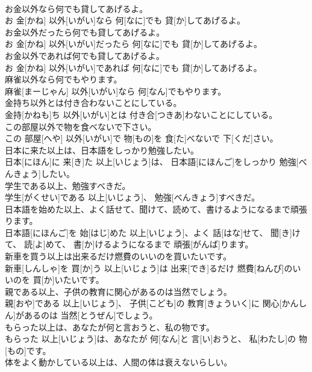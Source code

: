 \documentclass[8pt]{extreport}
\begin{document}
\begin{CJK}{UTF8}{min}
\\	お金以外なら何でも貸してあげるよ。	
\\	お 金[かね] 以外[いがい]なら 何[なに]でも 貸[か]してあげるよ。
\\	お金以外だったら何でも貸してあげるよ。	
\\	お 金[かね] 以外[いがい]だったら 何[なに]でも 貸[か]してあげるよ。
\\	お金以外であれば何でも貸してあげるよ。	
\\	お 金[かね] 以外[いがい]であれば 何[なに]でも 貸[か]してあげるよ。
\\	麻雀以外なら何でもやります。	
\\	麻雀[まーじゃん] 以外[いがい]なら 何[なん]でもやります。
\\	金持ち以外とは付き合わないことにしている。	
\\	金持[かねも]ち 以外[いがい]とは 付き合[つきあ]わないことにしている。
\\	この部屋以外で物を食べないで下さい。	
\\	この 部屋[へや] 以外[いがい]で 物[もの]を 食[た]べないで 下[くだ]さい。
\\	日本に来た以上は、日本語をしっかり勉強したい。	
\\	日本[にほん]に 来[き]た 以上[いじょう]は、 日本語[にほんご]をしっかり 勉強[べんきょう]したい。
\\	学生である以上、勉強すべきだ。	
\\	学生[がくせい]である 以上[いじょう]、 勉強[べんきょう]すべきだ。
\\	日本語を始めた以上、よく話せて、聞けて、読めて、書けるようになるまで頑張ります。	
\\	日本語[にほんご]を 始[はじ]めた 以上[いじょう]、よく 話[はな]せて、 聞[き]けて、 読[よ]めて、 書[か]けるようになるまで 頑張[がんば]ります。
\\	新車を買う以上は出来るだけ燃費のいいのを買いたいです。	
\\	新車[しんしゃ]を 買[か]う 以上[いじょう]は 出来[でき]るだけ 燃費[ねんぴ]のいいのを 買[か]いたいです。
\\	親である以上、子供の教育に関心があるのは当然でしょう。	
\\	親[おや]である 以上[いじょう]、 子供[こども]の 教育[きょういく]に 関心[かんしん]があるのは 当然[とうぜん]でしょう。
\\	もらった以上は、あなたが何と言おうと、私の物です。	
\\	もらった 以上[いじょう]は、あなたが 何[なん]と 言[い]おうと、 私[わたし]の 物[もの]です。
\\	体をよく動かしている以上は、人間の体は衰えないらしい。	

\end{CJK}
\end{document}
